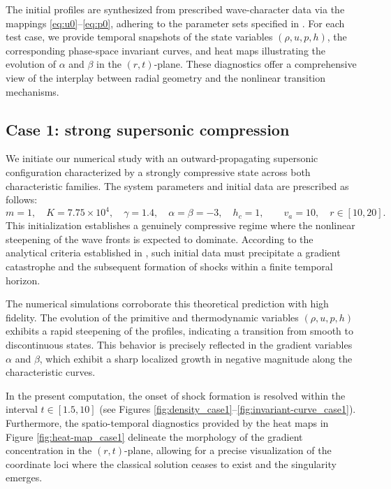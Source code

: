 \documentclass[11pt]{article}
\begin{document}
The initial profiles are synthesized from prescribed wave-character data via the mappings \eqref{eq:u0}--\eqref{eq:p0}, adhering to the parameter sets specified in \cite{F1}. For each test case, we provide temporal snapshots of the state variables $(\rho,u,p,h)$, the corresponding phase-space invariant curves, and heat maps illustrating the evolution of $\alpha$ and $\beta$ in the $(r,t)$-plane. These diagnostics offer a comprehensive view of the interplay between radial geometry and the nonlinear transition mechanisms.


\subsection*{Case 1: strong supersonic compression}

We initiate our numerical study with an outward-propagating supersonic configuration characterized by a strongly compressive state across both characteristic families. The system parameters and initial data are prescribed as follows:
\[
m=1,\quad K=7.75\times 10^{4},\quad \gamma=1.4,\quad \alpha=\beta=-3,\quad h_c=1,\qquad v_a=10,\quad r\in[10,20].
\]
This initialization establishes a genuinely compressive regime where the nonlinear steepening of the wave fronts is expected to dominate. According to the analytical criteria established in \cite{F1}, such initial data must precipitate a gradient catastrophe and the subsequent formation of shocks within a finite temporal horizon.

The numerical simulations corroborate this theoretical prediction with high fidelity. The evolution of the primitive and thermodynamic variables $(\rho,u,p,h)$ exhibits a rapid steepening of the profiles, indicating a transition from smooth to discontinuous states. This behavior is precisely reflected in the gradient variables $\alpha$ and $\beta$, which exhibit a sharp localized growth in negative magnitude along the characteristic curves.

In the present computation, the onset of shock formation is resolved within the interval $t \in [1.5,10]$ (see Figures \ref{fig:density_case1}--\ref{fig:invariant-curve_case1}). Furthermore, the spatio-temporal diagnostics provided by the heat maps in Figure \ref{fig:heat-map_case1} delineate the morphology of the gradient concentration in the $(r,t)$-plane, allowing for a precise visualization of the coordinate loci where the classical solution ceases to exist and the singularity emerges.
\end{document}
